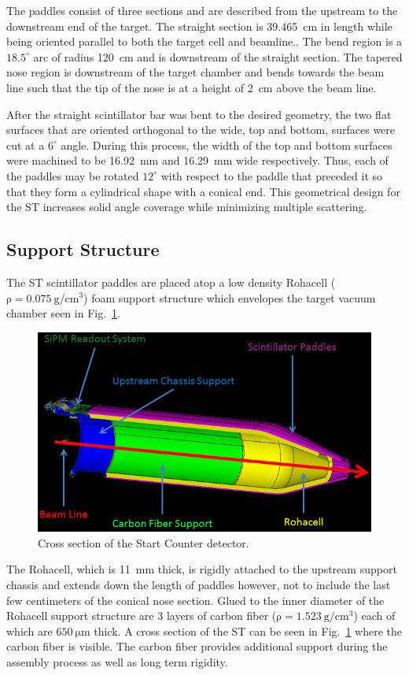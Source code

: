 The paddles consist of three sections and are described from the upstream to the downstream end of the target.  The straight section is 39.465~cm in length while being oriented parallel to both the target cell and beamline..  The bend region is a $18.5^{\circ}$ arc of radius 120~cm and is downstream of the straight section. The tapered nose region is downstream of the target chamber and bends towards the beam line such that the tip of the nose is at a height of 2~cm above the beam line.  

After the straight scintillator bar was bent to the desired geometry, the two flat surfaces that are oriented orthogonal to the wide, top and bottom, surfaces were cut at a $6^{\circ}$ angle.  During this process, the width of the top and bottom surfaces were machined to be 16.92~mm and 16.29~mm wide respectively.  Thus, each of the paddles may be rotated $12^{\circ}$ with respect to the paddle that preceded it so that they form a cylindrical shape with a conical end.  This geometrical design for the ST increases solid angle coverage while minimizing multiple scattering.  

\subsection{Support Structure} \label{sec:design_support}

The ST scintillator paddles are placed atop a low density Rohacell ($\mathrm{\rho = 0.075\ g/cm^{3}}$) foam support structure which envelopes the target vacuum chamber seen in Fig.~\ref{fig:ST_Cross_Section}.  
\begin{figure}[!htb]
	\centering
	\includegraphics[width=1.0\columnwidth]{design/figs/ST_Cross_Section}
	\caption[Cross section of the Start Counter detector]{Cross section of the Start Counter detector.}
	\label{fig:ST_Cross_Section}
\end{figure}
The Rohacell, which is 11~mm thick, is rigidly attached to the upstream support chassis and extends down the length of paddles however, not to include the last few centimeters of the conical nose section.  Glued to the inner diameter of the Rohacell support structure are 3 layers of carbon fiber ($\mathrm{\rho = 1.523\ g/cm^{3}}$) each of which are $\mathrm{650\ \mu m}$ thick.  A cross section of the ST can be seen in Fig.~\ref{fig:ST_Cross_Section} where the carbon fiber is visible.  The carbon fiber provides additional support during the assembly process as well as long term rigidity.  

